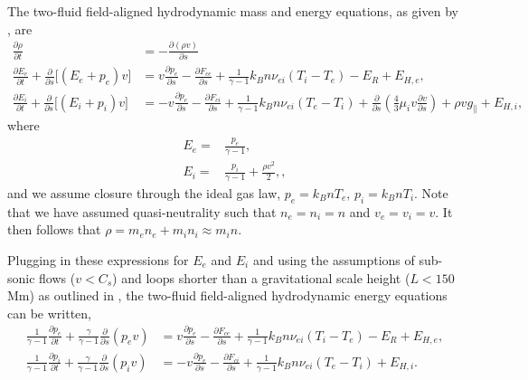 \documentclass[apj]{emulateapj}
\begin{document}
	\section{}
	\label{appendix}
	\par The two-fluid field-aligned hydrodynamic mass and energy equations, as given by \citet{bradshaw_influence_2013}, are
	\begin{align}
		\frac{\partial\rho}{\partial t} &= -\frac{\partial(\rho v)}{\partial s} \label{eq:1dmass} \\[0.5em]
		\frac{\partial E_e}{\partial t} + \frac{\partial}{\partial s} \lbrack(E_e+p_e)v\rbrack &= v\frac{\partial p_e}{\partial s} - \frac{\partial F_{ce}}{\partial s} + \frac{1}{\gamma - 1}k_Bn\nu_{ei}(T_i-T_e) -E_R+E_{H,e} , \label{eq:1denergy_e} \\[0.5em]
		\frac{\partial E_i}{\partial t} + \frac{\partial }{\partial s}\lbrack(E_i+p_i)v\rbrack &= -v\frac{\partial p_e}{\partial s} - \frac{\partial F_{ci}}{\partial s} + \frac{1}{\gamma - 1}k_Bn\nu_{ei}(T_e-T_i) + \frac{\partial}{\partial s}\left(\frac{4}{3}\mu_iv\frac{\partial v}{\partial s}\right) +\rho v g_{\parallel} + E_{H,i},\label{eq:1denergy_i}
	\end{align}
	where
	\begin{align}
		E_e =& \frac{p_e}{\gamma - 1} \label{eq:ee_closure}, \\[0.5em]
		E_i =& \frac{p_i}{\gamma - 1} + \frac{\rho v^2}{2}, \label{eq:ei_closure},
	\end{align}
	and we assume closure through the ideal gas law, $p_e=k_BnT_e,\,p_i=k_BnT_i$. Note that we have assumed quasi-neutrality such that $n_e=n_i=n$ and $v_e=v_i=v$. It then follows that $\rho=m_en_e+m_in_i\approx m_in$. 
	\par Plugging in these expressions for $E_e$ and $E_i$ and using the assumptions of sub-sonic flows ($v<C_s$) and loops shorter than a gravitational scale height ($L<150$ Mm) as outlined in \citet{klimchuk_highly_2008}, the two-fluid field-aligned hydrodynamic energy equations can be written,
	\begin{align}
		\frac{1}{\gamma - 1}\frac{\partial p_e}{\partial t} + \frac{\gamma}{\gamma - 1}\frac{\partial}{\partial s}(p_ev) &= v\frac{\partial p_e}{\partial s} - \frac{\partial F_{ce}}{\partial s} + \frac{1}{\gamma - 1}k_Bn\nu_{ei}(T_i-T_e) -E_R+E_{H,e}, \label{eq:1denergy_e_simp} \\[0.5em]
		\frac{1}{\gamma - 1}\frac{\partial p_i}{\partial t} + \frac{\gamma}{\gamma - 1}\frac{\partial }{\partial s}(p_iv)&= -v\frac{\partial p_e}{\partial s} - \frac{\partial F_{ci}}{\partial s} + \frac{1}{\gamma - 1}k_Bn\nu_{ei}(T_e-T_i) + E_{H,i}. \label{eq:1denergy_i_simp}
	\end{align}
\end{document}

